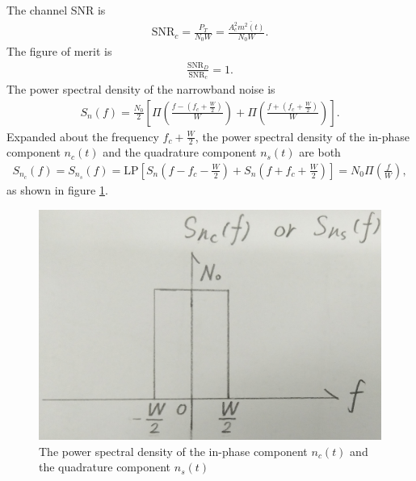 \documentclass{assignment}
\begin{document}
\begin{sol}
    The channel SNR is
    \begin{align}
        \text{SNR}_c=\frac{P_T}{N_0W}=\frac{A_c^2\overline{m^2(t)}}{N_0W}.
    \end{align}
    The figure of merit is
    \begin{align}
        \frac{\text{SNR}_D}{\text{SNR}_c}=1.
    \end{align}
    The power spectral density of the narrowband noise is
    \begin{align}
        S_n(f)=\frac{N_0}{2}\left[\Pi\left(\frac{f-\left(f_c+\frac{W}{2}\right)}{W}\right)+\Pi\left(\frac{f+\left(f_c+\frac{W}{2}\right)}{W}\right)\right].
    \end{align}
    Expanded about the frequency $f_c+\frac{W}{2}$, the power spectral density of the in-phase component $n_c(t)$ and the quadrature component $n_s(t)$ are both
    \begin{align}
        S_{n_c}(f)=S_{n_s}(f)=\text{LP}\left[S_n\left(f-f_c-\frac{W}{2}\right)+S_n\left(f+f_c+\frac{W}{2}\right)\right]=N_0\Pi\left(\frac{f}{W}\right),
    \end{align}
    as shown in figure \ref{P-6-A-2}.
    \begin{figure}[h]
        \centering
        \includegraphics[width=.4\columnwidth]{A-6-P-2.jpg}
        \caption{The power spectral density of the in-phase component $n_c(t)$ and the quadrature component $n_s(t)$}
        \label{P-6-A-2}
    \end{figure}
\end{sol}
\end{document}
